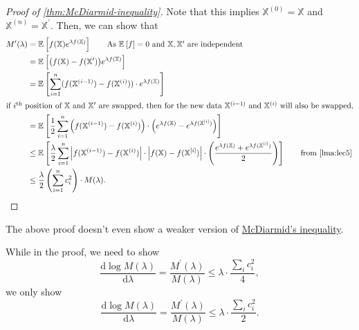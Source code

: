 \begin{proof}[Proof of \autoref{thm:McDiarmid-inequality}]
	Note that this implies \(\mathbb{X}^{(0)} = \mathbb{X}\) and \(\mathbb{X}^{(n)} = \mathbb{X}^{\prime} \). Then, we can show that
	\begin{align*}
		M^{\prime} (\lambda )
		 & = \mathbb{E}_{}\left[f(\mathbb{X}) e^{\lambda f(\mathbb{X})} \right] \tag*{As \(\mathbb{E}_{}\left[f \right] = 0\) and \(\mathbb{X}, \mathbb{X}^{\prime} \) are independent}                                                                                                                                                     \\
		 & = \mathbb{E}_{}\left[\big(f(\mathbb{X}) - f(\mathbb{X}^{\prime} )\big) e^{\lambda f(\mathbb{X})}\right]                                                                                                                                                                                                                          \\
		 & = \mathbb{E}_{}\left[ \sum_{i=1}^{n} (f(\mathbb{X}^{(i-1)}) - f(\mathbb{X}^{(i)})) \cdot e^{\lambda f(\mathbb{X})}\right]                                                                                                                                                                                                        \\
		\intertext{if \(i^{\text{th} }\) position of \(\mathbb{X}\) and \(\mathbb{X}^{\prime} \) are swapped, then for the new data \(\mathbb{X}^{(i-1)}\) and \(\mathbb{X}^{(i)}\) will also be swapped,}
		 & = \mathbb{E}_{}\left[\frac{1}{2} \sum_{i=1}^{n} \left( f(\mathbb{X}^{(i-1)}) - f(\mathbb{X}^{(i)}) \right) \cdot \left( e^{\lambda f(\mathbb{X})} - e^{\lambda f(\mathbb{X}^{[i]})} \right)  \right]                                                                                                                             \\
		 & \leq \mathbb{E}_{}\left[\frac{\lambda }{2} \sum_{i=1}^{n} \left\vert f(\mathbb{X}^{(i-1)}) - f(\mathbb{X}^{(i)}) \right\vert \cdot \left\vert f(\mathbb{X}) - f(\mathbb{X}^{[i]}) \right\vert \cdot \left( \frac{e^{\lambda f(\mathbb{X})} + e^{\lambda f(\mathbb{X}^{[i]})}}{2} \right)  \right] \tag*{from \autoref{lma:lec5}} \\
		 & \leq \frac{\lambda}{2}\left( \sum_{i=1}^{n} c_i^2 \right) \cdot M(\lambda ).
	\end{align*}
\end{proof}

\begin{note}
	The above proof doesn't even show a weaker version of \hyperref[thm:McDiarmid-inequality]{McDiarmid's inequality}.
\end{note}
\begin{explanation}
	While in the proof, we need to show
	\[
		\frac{\mathrm{d}\log M(\lambda )}{\mathrm{d}\lambda } = \frac{M^{\prime} (\lambda )}{M(\lambda )} \leq \lambda \cdot \frac{\sum_{i} c_i^2}{4},
	\]
	we only show
	\[
		\frac{\mathrm{d}\log M(\lambda )}{\mathrm{d}\lambda } = \frac{M^{\prime} (\lambda )}{M(\lambda )} \leq \lambda \cdot \frac{\sum_{i} c_i^2}{2}.
	\]
\end{explanation}

